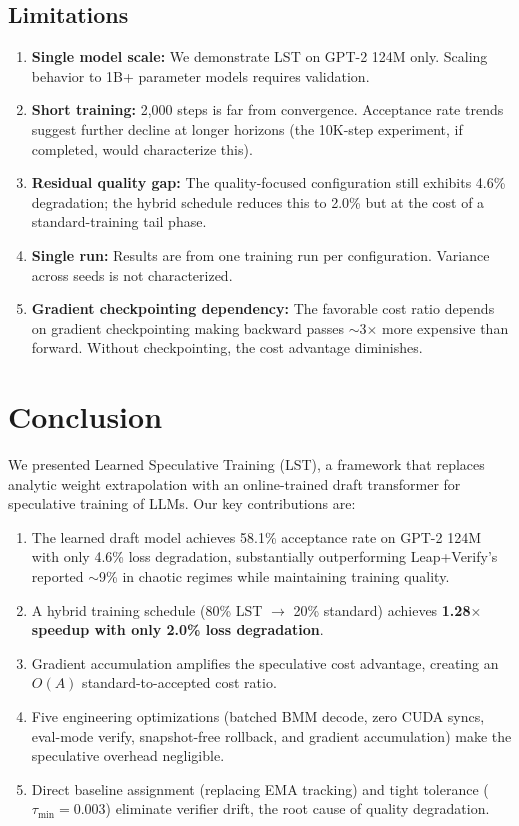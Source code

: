 \documentclass[conference]{IEEEtran}
\begin{document}
\subsection{Limitations}

\begin{enumerate}
    \item \textbf{Single model scale:} We demonstrate LST on GPT-2 124M only. Scaling behavior to 1B+ parameter models requires validation.
    \item \textbf{Short training:} 2,000 steps is far from convergence. Acceptance rate trends suggest further decline at longer horizons (the 10K-step experiment, if completed, would characterize this).
    \item \textbf{Residual quality gap:} The quality-focused configuration still exhibits 4.6\% degradation; the hybrid schedule reduces this to 2.0\% but at the cost of a standard-training tail phase.
    \item \textbf{Single run:} Results are from one training run per configuration. Variance across seeds is not characterized.
    \item \textbf{Gradient checkpointing dependency:} The favorable cost ratio depends on gradient checkpointing making backward passes $\sim$3$\times$ more expensive than forward. Without checkpointing, the cost advantage diminishes.
\end{enumerate}

\section{Conclusion}

We presented Learned Speculative Training (LST), a framework that replaces analytic weight extrapolation with an online-trained draft transformer for speculative training of LLMs. Our key contributions are:

\begin{enumerate}
    \item The learned draft model achieves 58.1\% acceptance rate on GPT-2 124M with only 4.6\% loss degradation, substantially outperforming Leap+Verify's reported $\sim$9\% in chaotic regimes while maintaining training quality.
    \item A hybrid training schedule (80\% LST $\rightarrow$ 20\% standard) achieves \textbf{1.28$\times$ speedup with only 2.0\% loss degradation}.
    \item Gradient accumulation amplifies the speculative cost advantage, creating an $O(A)$ standard-to-accepted cost ratio.
    \item Five engineering optimizations (batched BMM decode, zero CUDA syncs, eval-mode verify, snapshot-free rollback, and gradient accumulation) make the speculative overhead negligible.
    \item Direct baseline assignment (replacing EMA tracking) and tight tolerance ($\tau_{\min}{=}0.003$) eliminate verifier drift, the root cause of quality degradation.
\end{enumerate}
\end{document}

